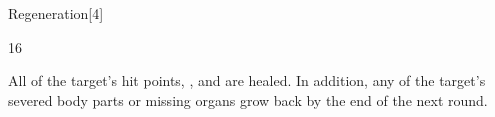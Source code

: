 \begin{spellsection}{Regeneration}[4]
\begin{spellcontent}
\begin{spelltargetinginfo}
 16
\end{spelltargetinginfo}
\begin{spelleffects}
\spelleffect
All of the target's hit points, , and  are healed.
In addition, any of the target's severed body parts or missing organs grow back by the end of the next round.
\end{spelleffects}
\end{spellcontent}
\begin{spellfooter}
\end{spellfooter}
\begin{spellsubcontent}
\end{spellsubcontent}
\end{spellsection}
